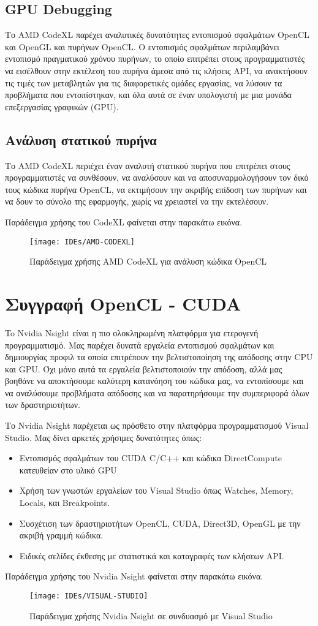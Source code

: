 \subsection{GPU Debugging}
Το AMD CodeXL παρέχει αναλυτικές δυνατότητες εντοπισμού σφαλμάτων OpenCL και OpenGL και πυρήνων OpenCL. Ο εντοπισμός σφαλμάτων περιλαμβάνει εντοπισμό πραγματικού χρόνου πυρήνων, το οποίο επιτρέπει στους προγραμματιστές να εισέλθουν στην εκτέλεση του πυρήνα άμεσα από τις κλήσεις API, να ανακτήσουν τις τιμές των μεταβλητών για τις διαφορετικές ομάδες εργασίας, να λύσουν τα προβλήματα που εντοπίστηκαν, και όλα αυτά σε έναν υπολογιστή με μια μονάδα επεξεργασίας γραφικών (GPU).

\subsection{Ανάλυση στατικού πυρήνα}
Το AMD CodeXL περιέχει έναν αναλυτή στατικού πυρήνα που επιτρέπει στους προγραμματιστές να συνθέσουν, να αναλύσουν και να αποσυναρμολογήσουν τον δικό τους κώδικα πυρήνα OpenCL, να εκτιμήσουν την ακριβής επίδοση των πυρήνων και να δουν το σύνολο της εφαρμογής, χωρίς να χρειαστεί να την εκτελέσουν.

Παράδειγμα χρήσης του CodeXL φαίνεται στην παρακάτω εικόνα.
\begin{figure}[h]
\centering
\texttt{[image: IDEs/AMD-CODEXL]}
\caption{Παράδειγμα χρήσης AMD CodeXL για ανάλυση κώδικα OpenCL}
\end{figure}

\section{Συγγραφή OpenCL - CUDA}
To Nvidia Nsight είναι η πιο ολοκληρωμένη πλατφόρμα για ετερογενή προγραμματισμό. Μας παρέχει δυνατά εργαλεία εντοπισμού σφαλμάτων και δημιουργίας προφιλ τα οποία επιτρέπουν την βελτιστοποίηση της απόδοσης στην CPU και GPU. Όχι μόνο αυτά τα εργαλεία βελτιστοποιούν την απόδοση, αλλά μας βοηθάνε να αποκτήσουμε καλύτερη κατανόηση του κώδικα μας, να εντοπίσουμε και να αναλύσουμε προβλήματα απόδοσης και να παρατηρήσουμε την συμπεριφορά όλων των δραστηριοτήτων. \cite{ides-4}

Το Nvidia Nsight παρέχεται ως πρόσθετο στην πλατφόρμα προγραμματισμού Visual Studio. Μας δίνει αρκετές χρήσιμες δυνατότητες όπως:
\begin{itemize}
\item Εντοπισμός σφαλμάτων του CUDA C/C++ και κώδικα DirectCompute κατευθείαν στο υλικό GPU
\item Χρήση των γνωστών εργαλείων του Visual Studio όπως Watches, Memory, Locals, και Breakpoints.
\item Συσχέτιση των δραστηριοτήτων OpenCL, CUDA, Direct3D, OpenGL με την ακριβή γραμμή κώδικα.
\item Ειδικές σελίδες έκθεσης με στατιστικά και καταγραφές των κλήσεων API.
\end{itemize}

Παράδειγμα χρήσης του Νvidia Nsight φαίνεται στην παρακάτω εικόνα.
\begin{figure}[h]
\centering
\texttt{[image: IDEs/VISUAL-STUDIO]}
\caption{Παράδειγμα χρήσης Nvidia Nsight σε συνδυασμό με Visual Studio}
\end{figure}
